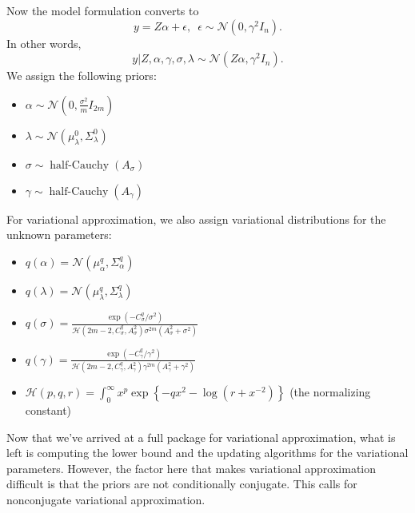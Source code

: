 \documentclass[11pt]{article}
\newcommand{\opn}{\operatorname}
\begin{document}
Now the model formulation converts to
$$
  y = Z\alpha + \epsilon, \,\,\, \epsilon \sim \mathcal{N}\left(0, \gamma^{2}I_{n}\right).
$$
In other words,
$$
  y|Z, \alpha, \gamma , \sigma, \lambda \sim \mathcal{N}\left(Z\alpha, \gamma^{2}I_{n} \right).
$$
We assign the following priors:
\begin{itemize}
  \item $\alpha \sim \mathcal{N}\left(0, \frac{\sigma^{2}}{m}I_{2m} \right)$
  \item $\lambda \sim \mathcal{N}\left(\mu_{\lambda}^{0}, \Sigma_{\lambda}^{0} \right) $
  \item $\sigma \sim \opn{half-Cauchy}\left(A_{\sigma} \right) $
  \item $\gamma \sim \opn{half-Cauchy}\left(A_{\gamma}\right) $
\end{itemize}
For variational approximation, we also assign variational distributions for the unknown parameters:
\begin{itemize}
  \item $q\left(\alpha \right) = \mathcal{N}\left(\mu_{\alpha}^{q}, \Sigma_{\alpha}^{q}\right) $
  \item $q\left(\lambda\right)=\mathcal{N}\left(\mu_{\lambda}^{q}, \Sigma_{\lambda}^{q}\right) $
  \item $q\left(\sigma \right) = \frac{\exp\left(-C_{\sigma}^{q}/\sigma^{2}\right)}{\mathcal{H}\left(2m-2, C_{\sigma}^{q}, A_{\sigma}^{2}\right)\sigma^{2m}\left(A_{\sigma}^{2}+\sigma^{2}\right)}$
  \item $q\left(\gamma \right) = \frac{\exp\left(-C_{\gamma}^{q}/\gamma^{2}\right)}{\mathcal{H}\left(2m-2, C_{\gamma}^{q}, A_{\gamma}^{2}\right)\gamma^{2m}\left(A_{\gamma}^{2}+\gamma^{2}\right)}$
  \item $\mathcal{H}\left(p,q,r\right) = \int_{0}^{\infty} x^{p}\exp \left\{-qx^{2} -\log \left(r + x^{-2}\right) \right\}$ (the normalizing constant)
\end{itemize}
Now that we've arrived at a full package for variational approximation, what is left is computing the lower bound and the updating algorithms for the variational parameters. However, the factor here that makes variational approximation difficult is that the priors are not conditionally conjugate. This calls for nonconjugate variational approximation.
\end{document}
